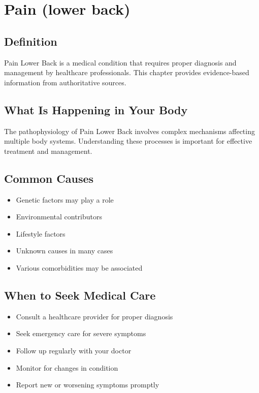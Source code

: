 
\chapter{Pain (lower back)}

\section*{Definition}
Pain Lower Back is a medical condition that requires proper diagnosis and management by healthcare professionals. This chapter provides evidence-based information from authoritative sources.

\section*{What Is Happening in Your Body}
The pathophysiology of Pain Lower Back involves complex mechanisms affecting multiple body systems. Understanding these processes is important for effective treatment and management.

\section*{Common Causes}
\begin{itemize}
  \item Genetic factors may play a role
  \item Environmental contributors
  \item Lifestyle factors
  \item Unknown causes in many cases
  \item Various comorbidities may be associated
\end{itemize}

\section*{When to Seek Medical Care}
\begin{itemize}
  \item Consult a healthcare provider for proper diagnosis
  \item Seek emergency care for severe symptoms
  \item Follow up regularly with your doctor
  \item Monitor for changes in condition
  \item Report new or worsening symptoms promptly
\end{itemize}

